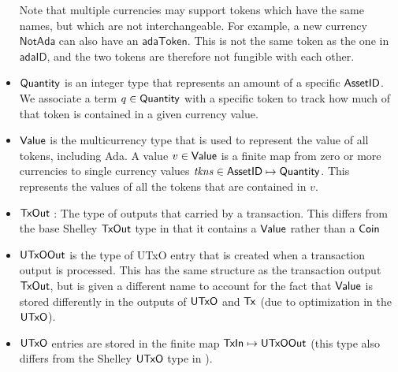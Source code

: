 \begin{itemize}

  Note that multiple currencies may support tokens which have the same names, but which are not interchangeable.
  For example, a new currency $\mathsf{NotAda}$ can also have an $\mathsf{adaToken}$.
  This is not the same token as the one in $\mathsf{adaID}$, and the two tokens are therefore not fungible with each other.

  \item $\mathsf{Quantity}$ is an integer type that represents an amount of a specific $\mathsf{AssetID}$. We associate
  a term $q\in\mathsf{Quantity}$ with a specific token to track how much of   that token is contained in a given currency value.

  \item $\mathsf{Value}$ is the multicurrency type that is used to represent
    the value of all tokens, including Ada.
  A value $v\in\mathsf{Value}$ is a finite map from zero or more currencies to single currency values $\mathit{tkns}\in\mathsf{AssetID} \mapsto \mathsf{Quantity}$.
  This represents the values of all the tokens that are contained in $v$.


\item $\mathsf{TxOut}$ : The type of outputs that carried by a transaction. This differs from the base Shelley
  $\mathsf{TxOut}$ type in that it contains a $\mathsf{Value}$ rather than a $\mathsf{Coin}$

  \item $\mathsf{UTxOOut}$ is the type of UTxO entry that is created when a transaction
  output is processed. This has the same structure as
  the transaction output $\mathsf{TxOut}$, but is given a different name to
  account for the fact that $\mathsf{Value}$ is stored differently in the outputs of $\mathsf{UTxO}$ and $\mathsf{Tx}$
  (due to optimization in the $\mathsf{UTxO}$).


  \item $\mathsf{UTxO}$ entries are stored in the finite map $\mathsf{TxIn}\mapsto \mathsf{UTxOOut}$
  (this type also differs from the Shelley $\mathsf{UTxO}$ type in ).

\end{itemize}

